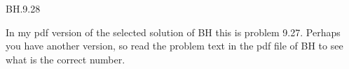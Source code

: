 
\setcounter{theorem}{27}
\begin{exercise} BH.9.28
\begin{solution}
In my pdf version of the selected solution of BH this is problem 9.27. Perhaps you have another version, so read the problem text in the pdf file of BH to see what is the correct number.
\end{solution}
\end{exercise}


